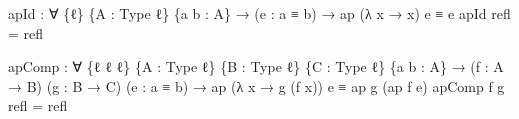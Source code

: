 \documentclass[
  11pt,
  oneside,
  article]{memoir}
\newenvironment{Shaded}{}{}
\newcommand{\NormalTok}[1]{#1}
\newcommand{\OtherTok}[1]{\textcolor[rgb]{0.00,0.44,0.13}{#1}}
\theoremstyle{definition}
\theoremstyle{plain}
\newcommand{\0}{\textsf{0}}
\newcommand{\1}{\tn{\textsf{1}}}
\begin{document}
\begin{Shaded}
\begin{Highlighting}[]
\NormalTok{apId }\OtherTok{:} \OtherTok{∀} \OtherTok{\{}\NormalTok{ℓ}\OtherTok{\}} \OtherTok{\{}\NormalTok{A }\OtherTok{:}\NormalTok{ Type ℓ}\OtherTok{\}} \OtherTok{\{}\NormalTok{a b }\OtherTok{:}\NormalTok{ A}\OtherTok{\}}
       \OtherTok{→} \OtherTok{(}\NormalTok{e }\OtherTok{:}\NormalTok{ a ≡ b}\OtherTok{)} \OtherTok{→}\NormalTok{ ap }\OtherTok{(λ}\NormalTok{ x }\OtherTok{→}\NormalTok{ x}\OtherTok{)}\NormalTok{ e ≡ e}
\NormalTok{apId refl }\OtherTok{=}\NormalTok{ refl}

\NormalTok{apComp }\OtherTok{:} \OtherTok{∀} \OtherTok{\{}\NormalTok{ℓ ℓ\textquotesingle{} ℓ\textquotesingle{}\textquotesingle{}}\OtherTok{\}} \OtherTok{\{}\NormalTok{A }\OtherTok{:}\NormalTok{ Type ℓ}\OtherTok{\}} \OtherTok{\{}\NormalTok{B }\OtherTok{:}\NormalTok{ Type ℓ\textquotesingle{}}\OtherTok{\}} \OtherTok{\{}\NormalTok{C }\OtherTok{:}\NormalTok{ Type ℓ\textquotesingle{}\textquotesingle{}}\OtherTok{\}} \OtherTok{\{}\NormalTok{a b }\OtherTok{:}\NormalTok{ A}\OtherTok{\}}
         \OtherTok{→} \OtherTok{(}\NormalTok{f }\OtherTok{:}\NormalTok{ A }\OtherTok{→}\NormalTok{ B}\OtherTok{)} \OtherTok{(}\NormalTok{g }\OtherTok{:}\NormalTok{ B }\OtherTok{→}\NormalTok{ C}\OtherTok{)} \OtherTok{(}\NormalTok{e }\OtherTok{:}\NormalTok{ a ≡ b}\OtherTok{)}
         \OtherTok{→}\NormalTok{ ap }\OtherTok{(λ}\NormalTok{ x }\OtherTok{→}\NormalTok{ g }\OtherTok{(}\NormalTok{f x}\OtherTok{))}\NormalTok{ e ≡ ap g }\OtherTok{(}\NormalTok{ap f e}\OtherTok{)}
\NormalTok{apComp f g refl }\OtherTok{=}\NormalTok{ refl}


\end{Highlighting}
\end{Shaded}
\end{document}

